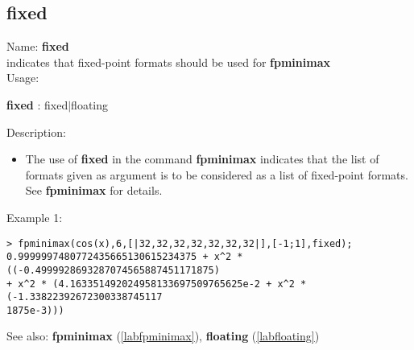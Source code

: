 \subsection{fixed}
\label{labfixed}
\noindent Name: \textbf{fixed}\\
indicates that fixed-point formats should be used for \textbf{fpminimax}\\

\noindent Usage: 
\begin{center}
\textbf{fixed} : \textsf{fixed$|$floating}\\
\end{center}
\noindent Description: \begin{itemize}

\item The use of \textbf{fixed} in the command \textbf{fpminimax} indicates that the list of
   formats given as argument is to be considered as a list of fixed-point
   formats.
   See \textbf{fpminimax} for details.
\end{itemize}
\noindent Example 1: 
\begin{center}\begin{minipage}{15cm}\begin{Verbatim}[frame=single]
> fpminimax(cos(x),6,[|32,32,32,32,32,32,32|],[-1;1],fixed);
0.9999997480772435665130615234375 + x^2 * ((-0.4999928693287074565887451171875) 
+ x^2 * (4.163351492024958133697509765625e-2 + x^2 * (-1.33822392672300338745117
1875e-3)))
\end{Verbatim}
\end{minipage}\end{center}
See also: \textbf{fpminimax} (\ref{labfpminimax}), \textbf{floating} (\ref{labfloating})
